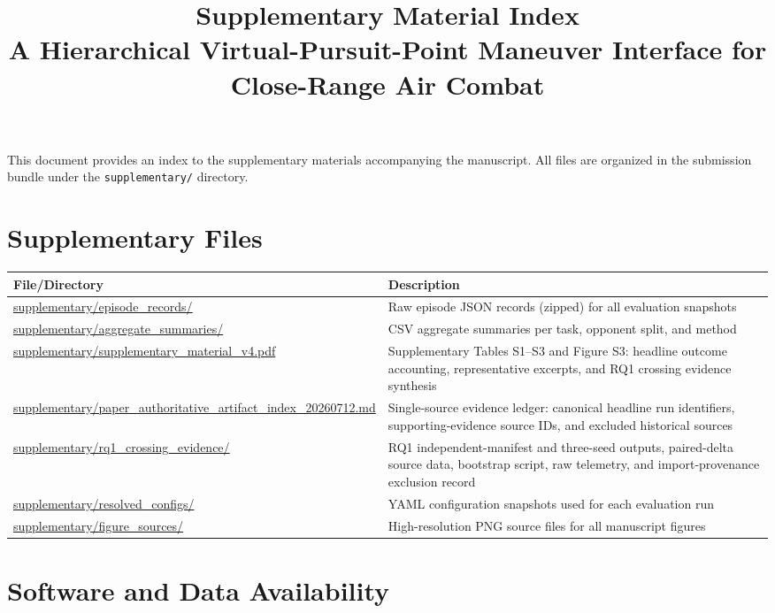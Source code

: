 \documentclass[11pt,a4paper]{article}
\title{Supplementary Material Index\\
\large A Hierarchical Virtual-Pursuit-Point Maneuver Interface for Close-Range Air Combat}
\author{}
\date{}
\begin{document}
\maketitle

\noindent
This document provides an index to the supplementary materials accompanying the manuscript. All files are organized in the submission bundle under the \texttt{supplementary/} directory.

\section*{Supplementary Files}

\begin{table}[h]
\centering
\small
\begin{tabular}{@{}>{\raggedright\arraybackslash}p{4.2cm}>{\raggedright\arraybackslash}p{9.2cm}@{}}
\toprule
File/Directory & Description \\
\midrule
\url{supplementary/episode_records/} & Raw episode JSON records (zipped) for all evaluation snapshots \\
\url{supplementary/aggregate_summaries/} & CSV aggregate summaries per task, opponent split, and method \\
\url{supplementary/supplementary_material_v4.pdf} & Supplementary Tables S1--S3 and Figure S3: headline outcome accounting, representative excerpts, and RQ1 crossing evidence synthesis \\
\url{supplementary/paper_authoritative_artifact_index_20260712.md} & Single-source evidence ledger: canonical headline run identifiers, supporting-evidence source IDs, and excluded historical sources \\
\url{supplementary/rq1_crossing_evidence/} & RQ1 independent-manifest and three-seed outputs, paired-delta source data, bootstrap script, raw telemetry, and import-provenance exclusion record \\
\url{supplementary/resolved_configs/} & YAML configuration snapshots used for each evaluation run \\
\url{supplementary/figure_sources/} & High-resolution PNG source files for all manuscript figures \\
\bottomrule
\end{tabular}
\end{table}

\section*{Software and Data Availability}
\end{document}
